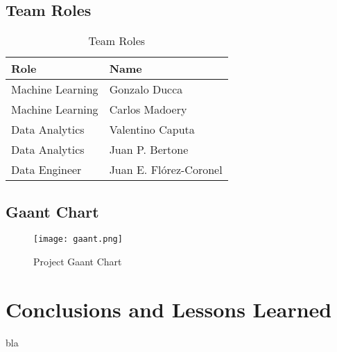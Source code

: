 \documentclass{other/docTemplate}
\begin{document}
\subsection{Team Roles}
\begin{table}[H]
  \centering	
  \caption{Team Roles}
  \begin{tabular}{|p{5cm}|p{10cm}|}
    \hline
    \textbf{Role} & \textbf{Name} \\\hline
    Machine Learning & Gonzalo Ducca \\\hline
    Machine Learning & Carlos Madoery \\\hline
    Data Analytics & Valentino Caputa \\\hline
    Data Analytics & Juan P. Bertone \\\hline
    Data Engineer & Juan E. Flórez-Coronel \\\hline
  \end{tabular}
  \label{tab:teamroles}
\end{table}
\subsection{Gaant Chart}
\begin{figure}[htbp!]
  \texttt{[image: gaant.png]}
  \caption{Project Gaant Chart}
  \label{fig:gaant}
\end{figure}

\clearpage
\section*{Conclusions and Lessons Learned}

bla

  
\end{document}
